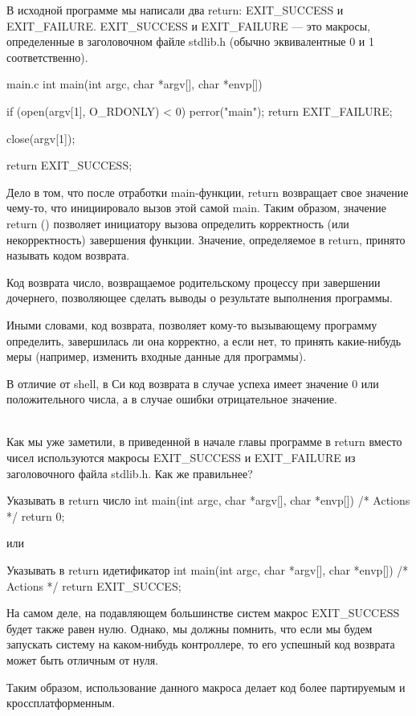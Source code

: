 В исходной программе мы написали два return: EXIT\_SUCCESS и EXIT\_FAILURE. EXIT\_SUCCESS и EXIT\_FAILURE --- это макросы, определенные в заголовочном файле stdlib.h (обычно эквивалентные 0 и 1 соответственно).

\begin{CCode}{main.c}
int main(int argc, char *argv[], char *envp[]) { 
	if (open(argv[1], O_RDONLY) < 0) {
		perror("main");			
		return EXIT_FAILURE;
	}	 
				
 	close(argv[1]);
 				
 	return EXIT_SUCCESS;
} \end{CCode}

Дело в том, что после отработки main-функции, return возвращает свое значение чему-то, что инициировало вызов этой самой main. Таким образом, значение return () позволяет инициатору вызова определить корректность (или некорректность) завершения функции. Значение, определяемое в return, принято называть кодом возврата.

\begin{defi}{Код возврата}
	число, возвращаемое родительскому процессу при завершении дочернего, позволяющее сделать выводы о результате выполнения программы.
\end{defi}

Иными словами, код возврата, позволяет кому-то вызывающему программу определить, завершилась ли она корректно, а если нет, то принять какие-нибудь меры (например, изменить входные данные для программы).

\begin{important}
	В отличие от shell, в Си код возврата в случае успеха имеет значение 0 или положительного числа, а в случае ошибки отрицательное значение.
\end{important}

\\
Как мы уже заметили, в приведенной в начале главы программе в return вместо чисел используются макросы EXIT\_SUCCESS и EXIT\_FAILURE из заголовочного файла stdlib.h. Как же правильнее?
	
\begin{CCode}{Указывать в return число}
	int main(int argc, char *argv[], char *envp[]) { 
			/* Actions */
			return 0; 
	} \end{CCode}

или

\begin{CCode}{Указывать в return идетификатор}
	int main(int argc, char *argv[], char *envp[]) { 
			/* Actions */
			return EXIT_SUCCES; 
	} \end{CCode}
		
На самом деле, на подавляющем большинстве систем макрос EXIT\_SUCCESS будет также равен нулю. Однако, мы должны помнить, что если мы будем запускать систему на каком-нибудь контроллере, то его успешный код возврата может быть отличным от нуля.

Таким образом, использование данного макроса делает код более партируемым и кроссплатформенным.


